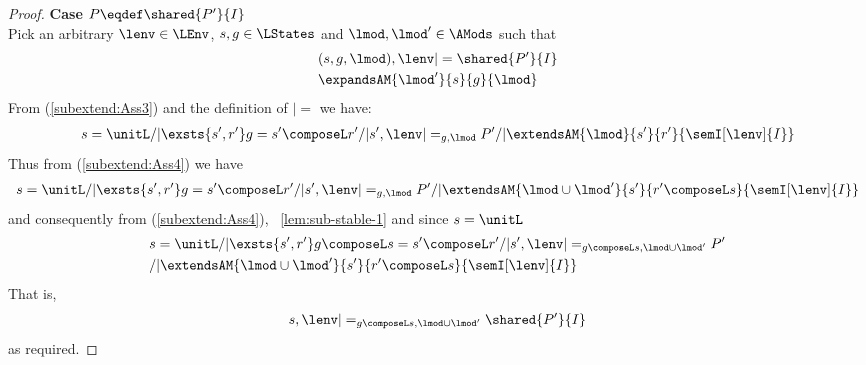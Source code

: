 \begin{lemma}[]
\begin{proof}
\noindent\textbf{Case $P \eqdef \shared{P'}{I}$} \\
Pick an arbitrary $\lenv \in \LEnv$, $s, g \in \LStates$ and $\lmod, \lmod' \in \AMods$ such that
%
\begin{align}
	& (s, g, \lmod), \lenv |= \shared{P'}{I} \label{subextend:Ass3}\\
	& \expandsAM{\lmod'}{s}{g}{\lmod} \label{subextend:Ass4}
\end{align}
%
From (\ref{subextend:Ass3}) and the definition of $|=$ we have:
%
\begin{align*}
	s = \unitL /| \exsts{s', r'} g = s' \composeL r' /| s', \lenv |=_{g, \lmod} P' /| \extendsAM{\lmod}{s'}{r'}{\semI[\lenv]{I}} 
\end{align*}  
%
Thus from (\ref{subextend:Ass4}) we have
%
\begin{align*}
	s = \unitL /| \exsts{s', r'} g = s' \composeL r' /| s', \lenv |=_{g, \lmod} P' /| \extendsAM{\lmod \cup \lmod'}{s'}{r' \composeL s}{\semI[\lenv]{I}}
\end{align*}
%
and consequently from (\ref{subextend:Ass4}), \lem~\ref{lem:sub-stable-1} and since $s = \unitL$
%
\begin{align*}
	& s = \unitL /| \exsts{s', r'} g \composeL s = s' \composeL r' /| s', \lenv |=_{g \composeL s, \lmod \cup \lmod'} P'  \\
	& /| \extendsAM{\lmod \cup \lmod'}{s'}{r' \composeL s}{\semI[\lenv]{I}}
\end{align*}
That is,
%
%
\begin{align*}
	s, \lenv |=_{g \composeL s, \lmod \cup \lmod'} \shared{P'}{I}
\end{align*}
%
as required.
\end{proof}
\end{lemma}
%
